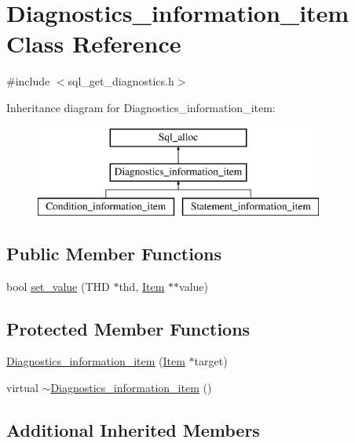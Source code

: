 \hypertarget{classDiagnostics__information__item}{}\section{Diagnostics\+\_\+information\+\_\+item Class Reference}
\label{classDiagnostics__information__item}


{\ttfamily \#include $<$sql\+\_\+get\+\_\+diagnostics.\+h$>$}

Inheritance diagram for Diagnostics\+\_\+information\+\_\+item\+:\begin{figure}[H]
\begin{center}
\leavevmode
\includegraphics[height=3.000000cm]{classDiagnostics__information__item}
\end{center}
\end{figure}
\subsection*{Public Member Functions}
\begin{DoxyCompactItemize}
\item 
bool \mbox{\hyperlink{classDiagnostics__information__item_a127b94424c2760818c42af7961522362}{set\+\_\+value}} (T\+HD $\ast$thd, \mbox{\hyperlink{classItem}{Item}} $\ast$$\ast$value)
\end{DoxyCompactItemize}
\subsection*{Protected Member Functions}
\begin{DoxyCompactItemize}
\item 
\mbox{\hyperlink{classDiagnostics__information__item_a40fbb8d9257b51c3ba2035bd39507fcf}{Diagnostics\+\_\+information\+\_\+item}} (\mbox{\hyperlink{classItem}{Item}} $\ast$target)
\item 
virtual \mbox{\hyperlink{classDiagnostics__information__item_aea065efb18863b1da4370c32ca2f6258}{$\sim$\+Diagnostics\+\_\+information\+\_\+item}} ()
\end{DoxyCompactItemize}
\subsection*{Additional Inherited Members}


